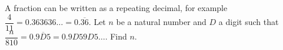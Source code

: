 A fraction can be written as a repeating decimal, for example $\dfrac{4}{11}=0.363636\ldots=0.\overline{36}$. Let $n$ be a natural number and $D$ a digit such that $\dfrac{n}{810}=0.\overline{9D5}=0.9D59D5\ldots$. Find $n$.
